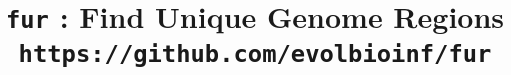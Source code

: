 

\pagestyle{noweb}

\title{\texttt{fur} : Find Unique Genome
Regions\\\small \texttt{https://github.com/evolbioinf/fur}}
\author{}
\maketitle

\tableofcontents





